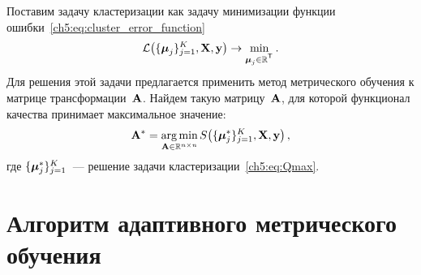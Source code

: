 Поставим задачу кластеризации как задачу минимизации функции ошибки~\eqref{ch5:eq:cluster_error_function}
\begin{equation}
	\label{ch5:eq:Qmax}
	\cL \bigl(\{\boldsymbol{\mu}_j\}_{j=1}^K, \bX, \by \bigr) \to \min_{\boldsymbol{\mu}_j \in \bbR^{\T}}.
\end{equation}
Для решения этой задачи предлагается применить метод метрического обучения к матрице трансформации~$\mathbf{A}$.
Найдем такую матрицу~$\mathbf{A}$, для которой функционал качества принимает максимальное значение:
\begin{equation}
	\label{ch5:eq:Amax}
	\mathbf{A}^* =\mathop{\arg \min}\limits_{\mathbf{A} \in \mathbb{R}^{n \times n}} S \bigl(\{\boldsymbol{\mu}_j^*\}_{j=1}^K, \mathbf{X}, \mathbf{y} \bigr)\,,
\end{equation}
где $\{\boldsymbol{\mu}_j^*\}_{j=1}^K$~--- решение задачи кластеризации~\eqref{ch5:eq:Qmax}.

\section{Алгоритм адаптивного метрического обучения}
\label{sec:ch5:metric_learning_adaptive}


